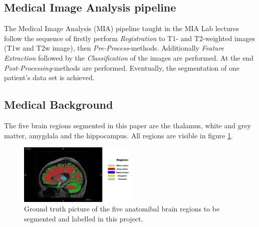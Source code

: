 \documentclass[journal]{IEEEtran}
\begin{document}
\subsection{Medical Image Analysis pipeline}
	The Medical Image Analysis (MIA) pipeline taught in the MIA Lab lectures follow the sequence of firstly perform {\itshape Registration} to T1- and T2-weighted images (T1w and T2w image), then {\itshape Pre-Process}-methods. Additionally {\itshape Feature Extraction} followed by the {\itshape Classification} of the images are performed. 
	At the end {\itshape Post-Processing}-methods are performed. Eventually, the segmentation of one patient's data set is achieved. 

\subsection{Medical Background}
	The five brain regions segmented in this paper are the thalamus, white and grey matter, amygdala and the hippocampus. All regions are visible in figure \ref{fig:e1}.

	\begin{figure}[h]
		\centering
		\includegraphics[width=0.5\textwidth]{T1native_all_regions_labelled.png}
		\caption{Ground truth picture of the five anatomibal brain regions to be segmented and labelled in this project.}
		\label{fig:e1}
	\end{figure}
\end{document}
